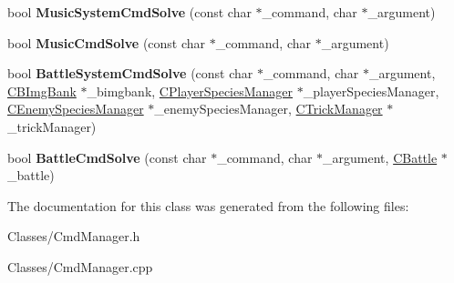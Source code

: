 \begin{DoxyCompactItemize}
\item 
bool {\bfseries Music\+System\+Cmd\+Solve} (const char $\ast$\+\_\+command, char $\ast$\+\_\+argument)\hypertarget{class_c_cmd_manager_ac2857c9400b5ef1a96867fa67e987a8c}{}\label{class_c_cmd_manager_ac2857c9400b5ef1a96867fa67e987a8c}

\item 
bool {\bfseries Music\+Cmd\+Solve} (const char $\ast$\+\_\+command, char $\ast$\+\_\+argument)\hypertarget{class_c_cmd_manager_af51d26aad1770e86fd475de812b99751}{}\label{class_c_cmd_manager_af51d26aad1770e86fd475de812b99751}

\item 
bool {\bfseries Battle\+System\+Cmd\+Solve} (const char $\ast$\+\_\+command, char $\ast$\+\_\+argument, \hyperlink{class_c_b_img_bank}{C\+B\+Img\+Bank} $\ast$\+\_\+bimgbank, \hyperlink{class_c_player_species_manager}{C\+Player\+Species\+Manager} $\ast$\+\_\+player\+Species\+Manager, \hyperlink{class_c_enemy_species_manager}{C\+Enemy\+Species\+Manager} $\ast$\+\_\+enemy\+Species\+Manager, \hyperlink{class_c_trick_manager}{C\+Trick\+Manager} $\ast$\+\_\+trick\+Manager)\hypertarget{class_c_cmd_manager_a99b57496818f386d50e79129e37f849a}{}\label{class_c_cmd_manager_a99b57496818f386d50e79129e37f849a}

\item 
bool {\bfseries Battle\+Cmd\+Solve} (const char $\ast$\+\_\+command, char $\ast$\+\_\+argument, \hyperlink{class_c_battle}{C\+Battle} $\ast$\+\_\+battle)\hypertarget{class_c_cmd_manager_a8c206d25a8c920ed68130da64f41efb5}{}\label{class_c_cmd_manager_a8c206d25a8c920ed68130da64f41efb5}

\end{DoxyCompactItemize}


The documentation for this class was generated from the following files\+:\begin{DoxyCompactItemize}
\item 
Classes/Cmd\+Manager.\+h\item 
Classes/Cmd\+Manager.\+cpp\end{DoxyCompactItemize}

